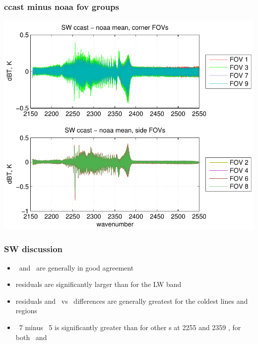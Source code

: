 \documentclass[11pt]{beamer}
\begin{document}
\begin{frame}
\frametitle{ccast minus noaa fov groups}


\begin{center}
  \includegraphics[scale=0.7]{figures/ccast_noaa_SW_fig_2.pdf}
\end{center}

\end{frame}
\begin{frame}
\frametitle{SW discussion}

\begin{itemize}

  \item \ccast\ and \noaa\ are generally in good agreement

  \item residuals are significantly larger than for the LW band

  \item residuals and \noaa\ vs \ccast\ differences are generally
    greatest for the coldest lines and regions

  \item \fov\ 7 minus \fov\ 5 is significantly greater than for other
    \fov s at 2255 and 2359 \wnum, for both \ccast\ and \noaa

\end{itemize}

\end{frame}
\end{document}
